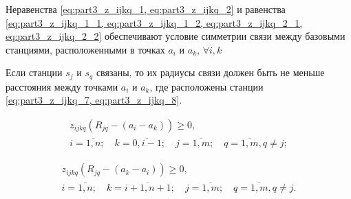 





Неравенства \cref{eq:part3_z_ijkq_1, eq:part3_z_ijkq_2} и равенства \cref{eq:part3_z_ijkq_1_1, eq:part3_z_ijkq_1_2, eq:part3_z_ijkq_2_1, eq:part3_z_ijkq_2_2} обеспечивают условие симметрии связи между базовыми станциями, расположенными в точках $ a_i $ и $ a_k $, $\forall i, k $ 


Если станции $ s_j $ и $ s_q $ связаны, то их радиусы связи должен быть не меньше расстояния между точками $ a_i $ и $ a_k $, где расположены станции \cref{eq:part3_z_ijkq_7, eq:part3_z_ijkq_8}.

\begin{equation}
    \begin{gathered}
  \label{eq:part3_z_ijkq_7}
  z_{ijkq}(R_{jq}-(a_i-a_k ))\geq 0, \\i= \overline{1,n}; \quad k=\overline{0,i-1}; \quad j=\overline{1,m}; \quad q= \overline{1,m}, q \neq j; 
    \end{gathered}
\end{equation}

\begin{equation}
    \begin{gathered}
  \label{eq:part3_z_ijkq_8}
  z_{ijkq} (R_{jq}-(a_k-a_i )) \geq 0,  \\ i= \overline{1,n}; \quad k=\overline{i+1,n+1};  \quad j=\overline{1,m}; \quad q= \overline{1,m}, q \neq j.
    \end{gathered}
\end{equation}

